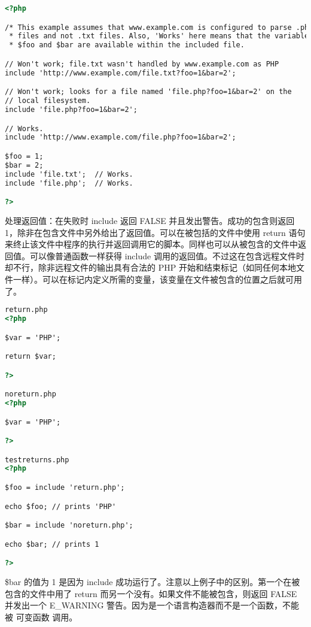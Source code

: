 \begin{lstlisting}[language=HTML]
<?php

/* This example assumes that www.example.com is configured to parse .php *
 * files and not .txt files. Also, 'Works' here means that the variables *
 * $foo and $bar are available within the included file.                 */

// Won't work; file.txt wasn't handled by www.example.com as PHP
include 'http://www.example.com/file.txt?foo=1&bar=2';

// Won't work; looks for a file named 'file.php?foo=1&bar=2' on the
// local filesystem.
include 'file.php?foo=1&bar=2';

// Works.
include 'http://www.example.com/file.php?foo=1&bar=2';

$foo = 1;
$bar = 2;
include 'file.txt';  // Works.
include 'file.php';  // Works.

?>
\end{lstlisting}

处理返回值：在失败时 include 返回 FALSE 并且发出警告。成功的包含则返回 1，除非在包含文件中另外给出了返回值。可以在被包括的文件中使用 return 语句来终止该文件中程序的执行并返回调用它的脚本。同样也可以从被包含的文件中返回值。可以像普通函数一样获得 include 调用的返回值。不过这在包含远程文件时却不行，除非远程文件的输出具有合法的 PHP 开始和结束标记（如同任何本地文件一样）。可以在标记内定义所需的变量，该变量在文件被包含的位置之后就可用了。


\begin{lstlisting}[language=HTML]
return.php
<?php

$var = 'PHP';

return $var;

?>

noreturn.php
<?php

$var = 'PHP';

?>

testreturns.php
<?php

$foo = include 'return.php';

echo $foo; // prints 'PHP'

$bar = include 'noreturn.php';

echo $bar; // prints 1

?>
\end{lstlisting}


\$bar 的值为 1 是因为 include 成功运行了。注意以上例子中的区别。第一个在被包含的文件中用了 return 而另一个没有。如果文件不能被包含，则返回 FALSE 并发出一个 E\_WARNING 警告。因为是一个语言构造器而不是一个函数，不能被 可变函数 调用。

